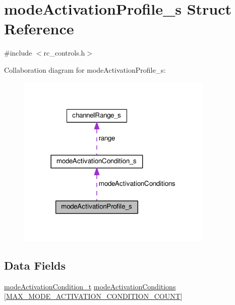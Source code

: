 \hypertarget{structmodeActivationProfile__s}{\section{mode\+Activation\+Profile\+\_\+s Struct Reference}
\label{structmodeActivationProfile__s}
}


{\ttfamily \#include $<$rc\+\_\+controls.\+h$>$}



Collaboration diagram for mode\+Activation\+Profile\+\_\+s\+:\nopagebreak
\begin{figure}[H]
\begin{center}
\leavevmode
\includegraphics[width=266pt]{structmodeActivationProfile__s__coll__graph}
\end{center}
\end{figure}
\subsection*{Data Fields}
\begin{DoxyCompactItemize}
\item 
\hyperlink{rc__controls_8h_a23d0b2f96c4164c489bedb5e2d7ece98}{mode\+Activation\+Condition\+\_\+t} \hyperlink{structmodeActivationProfile__s_adc750df729f5f32c8f9e4917d245fc96}{mode\+Activation\+Conditions} \mbox{[}\hyperlink{rc__controls_8h_a99bfbfa8c2da6ff3d7c806dd4db019b2}{M\+A\+X\+\_\+\+M\+O\+D\+E\+\_\+\+A\+C\+T\+I\+V\+A\+T\+I\+O\+N\+\_\+\+C\+O\+N\+D\+I\+T\+I\+O\+N\+\_\+\+C\+O\+U\+N\+T}\mbox{]}
\end{DoxyCompactItemize}


